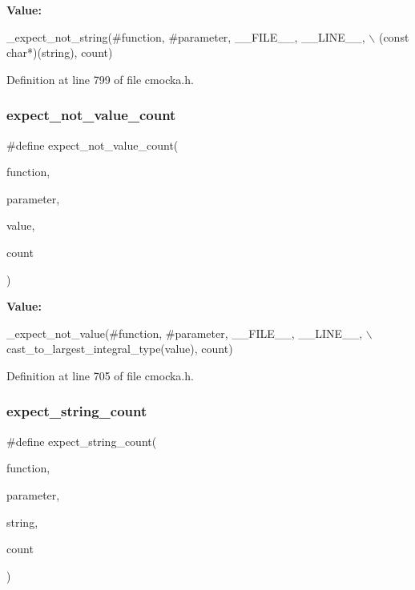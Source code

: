 {\bfseries Value\+:}
\begin{DoxyCode}
\_expect\_not\_string(#\textcolor{keyword}{function}, #parameter, \_\_FILE\_\_, \_\_LINE\_\_, \(\backslash\)
                       (\textcolor{keyword}{const} \textcolor{keywordtype}{char}*)(\textcolor{keywordtype}{string}), count)
\end{DoxyCode}


Definition at line 799 of file cmocka.\+h.

\mbox{\label{group__cmocka__param_ga0c19667f9755002d13cf7cb6057fe65e}} 
\subsubsection{\texorpdfstring{expect\+\_\+not\+\_\+value\+\_\+count}{expect\_not\_value\_count}}
{\footnotesize\ttfamily \#define expect\+\_\+not\+\_\+value\+\_\+count(\begin{DoxyParamCaption}\item[{}]{function,  }\item[{}]{parameter,  }\item[{}]{value,  }\item[{}]{count }\end{DoxyParamCaption})}

{\bfseries Value\+:}
\begin{DoxyCode}
\_expect\_not\_value(#\textcolor{keyword}{function}, #parameter, \_\_FILE\_\_, \_\_LINE\_\_, \(\backslash\)
                      cast\_to\_largest\_integral\_type(value), count)
\end{DoxyCode}


Definition at line 705 of file cmocka.\+h.

\mbox{\label{group__cmocka__param_gaf2627293dce3a0e99d404bff7667ee92}} 
\subsubsection{\texorpdfstring{expect\+\_\+string\+\_\+count}{expect\_string\_count}}
{\footnotesize\ttfamily \#define expect\+\_\+string\+\_\+count(\begin{DoxyParamCaption}\item[{}]{function,  }\item[{}]{parameter,  }\item[{}]{string,  }\item[{}]{count }\end{DoxyParamCaption})}

